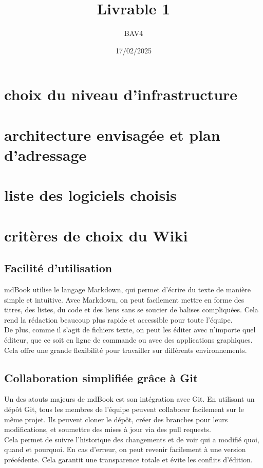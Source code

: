 \documentclass{article}
\title{Livrable 1}
\author{BAV4}
\date{17/02/2025}
\begin{document}
\section{choix du niveau d’infrastructure}

\section{architecture envisagée et plan d’adressage}

\section{liste des logiciels choisis}

\section{critères de choix du Wiki}
    \subsection{Facilité d’utilisation}
    mdBook utilise le langage Markdown, qui permet d’écrire du texte de manière simple et intuitive. Avec Markdown, on peut facilement mettre en forme des titres, des listes, du code et des liens sans se soucier de balises compliquées. Cela rend la rédaction beaucoup plus rapide et accessible pour toute l’équipe.\\


    De plus, comme il s’agit de fichiers texte, on peut les éditer avec n’importe quel éditeur, que ce soit en ligne de commande ou avec des applications graphiques. Cela offre une grande flexibilité pour travailler sur différents environnements.

    \subsection{Collaboration simplifiée grâce à Git}
    Un des atouts majeurs de mdBook est son intégration avec Git. En utilisant un dépôt Git, tous les membres de l’équipe peuvent collaborer facilement sur le même projet. Ils peuvent cloner le dépôt, créer des branches pour leurs modifications, et soumettre des mises à jour via des pull requests.\\

Cela permet de suivre l’historique des changements et de voir qui a modifié quoi, quand et pourquoi. En cas d’erreur, on peut revenir facilement à une version précédente. Cela garantit une transparence totale et évite les conflits d’édition.
\end{document}
